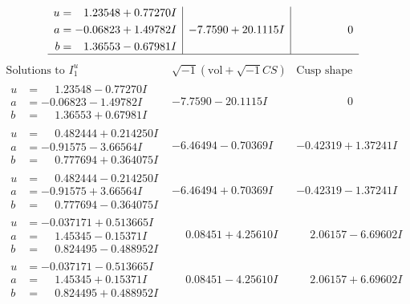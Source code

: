 \documentclass[1p]{elsarticle_modified}
\theoremstyle{definition}
\newcommand{\I}{\sqrt{-1}}
\begin{document}
$$\begin{array}{c|c|c}
\begin{aligned}
u &= \phantom{-}1.23548 + 0.77270 I \\
a &= -0.06823 + 1.49782 I \\
b &= \phantom{-}1.36553 - 0.67981 I\end{aligned}
 & -7.7590 + 20.1115 I & \phantom{-0.000000 } 0\\
 \hline 
 \end{array}$$\newpage$$\begin{array}{c|c|c}  
\text{Solutions to }I^u_{1}& \I (\text{vol} + \sqrt{-1}CS) & \text{Cusp shape}\\
 \hline 
\begin{aligned}
u &= \phantom{-}1.23548 - 0.77270 I \\
a &= -0.06823 - 1.49782 I \\
b &= \phantom{-}1.36553 + 0.67981 I\end{aligned}
 & -7.7590 - 20.1115 I & \phantom{-0.000000 } 0 \\ \hline\begin{aligned}
u &= \phantom{-}0.482444 + 0.214250 I \\
a &= -0.91575 - 3.66564 I \\
b &= \phantom{-}0.777694 + 0.364075 I\end{aligned}
 & -6.46494 - 0.70369 I & -0.42319 + 1.37241 I \\ \hline\begin{aligned}
u &= \phantom{-}0.482444 - 0.214250 I \\
a &= -0.91575 + 3.66564 I \\
b &= \phantom{-}0.777694 - 0.364075 I\end{aligned}
 & -6.46494 + 0.70369 I & -0.42319 - 1.37241 I \\ \hline\begin{aligned}
u &= -0.037171 + 0.513665 I \\
a &= \phantom{-}1.45345 - 0.15371 I \\
b &= \phantom{-}0.824495 - 0.488952 I\end{aligned}
 & \phantom{-}0.08451 + 4.25610 I & \phantom{-}2.06157 - 6.69602 I \\ \hline\begin{aligned}
u &= -0.037171 - 0.513665 I \\
a &= \phantom{-}1.45345 + 0.15371 I \\
b &= \phantom{-}0.824495 + 0.488952 I\end{aligned}
 & \phantom{-}0.08451 - 4.25610 I & \phantom{-}2.06157 + 6.69602 I \\ \hline\begin{aligned}

\end{aligned}
\end{array}$$
\end{document}
